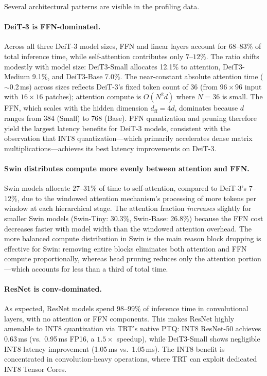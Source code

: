 \documentclass[runningheads,a4paper]{llncs}
\begin{document}
Several architectural patterns are visible in the profiling data.

\paragraph{DeiT-3 is FFN-dominated.}
Across all three DeiT-3 model sizes, FFN and linear layers account for $68$--$83\%$ of total inference time, while self-attention contributes only $7$--$12\%$. The ratio shifts modestly with model size: DeiT3-Small allocates 12.1\% to attention, DeiT3-Medium 9.1\%, and DeiT3-Base 7.0\%. The near-constant absolute attention time ($\sim$0.2\,ms) across sizes reflects DeiT-3's fixed token count of 36 (from $96\times96$ input with $16\times16$ patches); attention compute is $O(N^2 d)$ where $N=36$ is small. The FFN, which scales with the hidden dimension $d_{\text{ff}} = 4d$, dominates because $d$ ranges from 384 (Small) to 768 (Base). FFN quantization and pruning therefore yield the largest latency benefits for DeiT-3 models, consistent with the observation that INT8 quantization---which primarily accelerates dense matrix multiplications---achieves its best latency improvements on DeiT-3.

\paragraph{Swin distributes compute more evenly between attention and FFN.}
Swin models allocate $27$--$31\%$ of time to self-attention, compared to DeiT-3's $7$--$12\%$, due to the windowed attention mechanism's processing of more tokens per window at each hierarchical stage. The attention fraction \emph{increases} slightly for smaller Swin models (Swin-Tiny: 30.3\%, Swin-Base: 26.8\%) because the FFN cost decreases faster with model width than the windowed attention overhead. The more balanced compute distribution in Swin is the main reason block dropping is effective for Swin: removing entire blocks eliminates both attention and FFN compute proportionally, whereas head pruning reduces only the attention portion---which accounts for less than a third of total time.

\paragraph{ResNet is conv-dominated.}
As expected, ResNet models spend $98$--$99\%$ of inference time in convolutional layers, with no attention or FFN components. This makes ResNet highly amenable to INT8 quantization via TRT's native PTQ: INT8 ResNet-50 achieves 0.63\,ms (vs.\ 0.95\,ms FP16, a $1.5\times$ speedup), while DeiT3-Small shows negligible INT8 latency improvement (1.05\,ms vs.\ 1.05\,ms). The INT8 benefit is concentrated in convolution-heavy operations, where TRT can exploit dedicated INT8 Tensor Cores.
\end{document}

